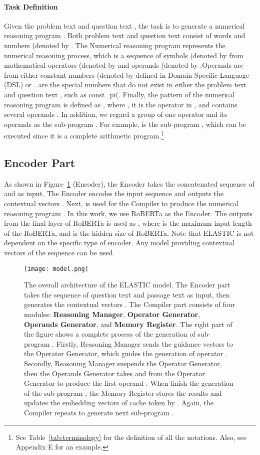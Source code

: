 \documentclass{article}
\begin{document}
\paragraph{Task Definition}
Given the problem text  and question text , the task is to generate a numerical reasoning program . Both problem text  and question text  consist of words and numbers (denoted by . The Numerical reasoning program  represents the numerical reasoning process, which is a sequence of symbols (denoted by  from mathematical operators (denoted by  and operands (denoted by .Operands  are from either constant numbers (denoted by  defined in Domain Specific Language (DSL) or .  are the special numbers that do not exist in either the problem text  and question text , such as const\_pi(. Finally, the pattern of the numerical reasoning program  is defined as , where , it is the   operator in , and  contains several operands . In addition, we regard a group of one operator and its operands as the sub-program . For example,  is the  sub-program , which can be executed since it is a complete arithmetic program.\footnote{See Table~\ref{tab:terminology} for the definition of all the notations. Also, see Appendix E for an example.}

\subsection{Encoder Part}

As shown in Figure~\ref{fig:Model-Architecture} (Encoder), the Encoder takes the concatenated sequence of  and  as input. The Encoder encodes the input sequence and outputs the contextual vectors . Next,  is used for the Compiler to produce the numerical reasoning program . In this work, we use RoBERTa as the Encoder. The outputs from the final layer of RoBERTa is used as , where  is the maximum input length of the RoBERTa, and  is the hidden size of RoBERTa. Note that ELASTIC is not dependent on the specific type of encoder. Any model providing contextual vectors of the sequence can be used. 



\begin{figure}[tbph!] 
\centering
\texttt{[image: model.png]} 
\caption{The overall architecture of the ELASTIC model. The Encoder part takes the sequence of question text  and passage text  as input, then generates the contextual vectors . The Compiler part consists of four modules: \textbf{Reasoning Manager}, \textbf{Operator Generator}, \textbf{Operands Generator}, and \textbf{Memory Register}. The right part of the figure shows a complete process of the generation of sub-program . Firstly, Reasoning Manager sends the guidance vectors  to the Operator Generator, which guides the generation of operator . Secondly, Reasoning Manager suspends the Operator Generator, then the Operands Generator takes  and  from the Operator Generator to produce the first operand . When finish the generation of the sub-program , the Memory Register stores the results and updates the embedding vectors of cache token  by . Again, the Compiler repeats to generate next sub-program .} 
\label{fig:Model-Architecture}
\end{figure}
\end{document}
